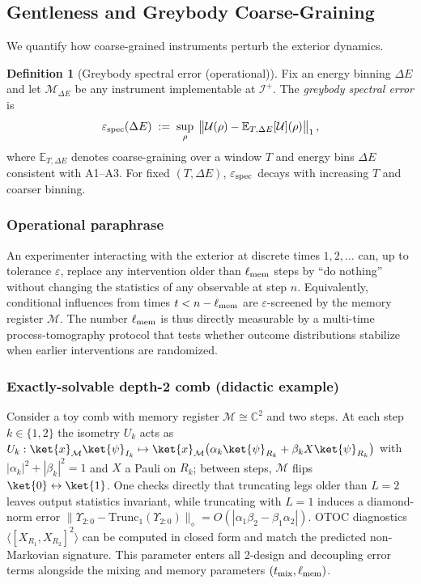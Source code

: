\documentclass[11pt,a4paper]{article}
\theoremstyle{plain}
\theoremstyle{definition}
\newtheorem{definition}[theorem]{Definition}
\theoremstyle{remark}
\begin{document}
\subsection{Gentleness and Greybody Coarse-Graining}

\label{sec:gentleness}
We quantify how coarse-grained instruments perturb the exterior dynamics.
\begin{definition}[Greybody spectral error (operational)]
Fix an energy binning $\Delta E$ and let $\mathcal{M}_{\Delta E}$ be any instrument implementable at $\mathscr{I}^+$. The \emph{greybody spectral error} is
\begin{equation*}
\varepsilon_{\rm spec}(\Delta E) \;:=\; \sup_{\rho}\; \big\| \mathcal{U}(\rho) - \mathbb{E}_{T,\Delta E}[\mathcal{U}](\rho) \big\|_1\,,
\end{equation*}
where $\mathbb{E}_{T,\Delta E}$ denotes coarse-graining over a window $T$ and energy bins $\Delta E$ consistent with A1--A3. For fixed $(T,\Delta E)$, $\varepsilon_{\rm spec}$ decays with increasing $T$ and coarser binning.
\end{definition}

\subsubsection{Operational paraphrase}
An experimenter interacting with the exterior at discrete times $1,2,\dots$ can, up to tolerance $\varepsilon$,
replace any intervention older than $\ell_{\rm mem}$ steps by ``do nothing'' without changing the statistics
of any observable at step $n$. Equivalently, conditional influences from times $t<n-\ell_{\rm mem}$ are
$\varepsilon$-screened by the memory register $\mathcal{M}$. The number $\ell_{\rm mem}$ is thus directly
measurable by a multi-time process-tomography protocol that tests whether outcome distributions stabilize
when earlier interventions are randomized.

\subsubsection*{Exactly-solvable depth-2 comb (didactic example)}
\label{sssec:depth2-didactic}
Consider a toy comb with memory register $\mathcal{M}\cong\mathbb{C}^2$ and two steps.
At each step $k\in\{1,2\}$ the isometry $U_k$ acts as
$U_k:\ket{x}_{\mathcal{M}}\ket{\psi}_{I_k}\mapsto \ket{x}_{\mathcal{M}}\big(\alpha_k \ket{\psi}_{R_k}+\beta_k X\ket{\psi}_{R_k}\big)$
with $|\alpha_k|^2+|\beta_k|^2=1$ and $X$ a Pauli on $R_k$; between steps, $\mathcal{M}$ flips $\ket{0}\leftrightarrow\ket{1}$.
One checks directly that truncating legs older than $L{=}2$ leaves output statistics invariant, while truncating with $L{=}1$
induces a diamond-norm error $\|\Upsilon_{2{:}0}-\mathrm{Trunc}_1(\Upsilon_{2{:}0})\|_\diamond = O(|\alpha_1\beta_2-\beta_1\alpha_2|)$.
OTOC diagnostics $\langle [X_{R_1},X_{R_2}]^2\rangle$ can be computed in closed form and match the predicted non-Markovian signature.
This parameter enters all 2-design and decoupling error terms alongside the mixing and memory parameters $(t_{\rm mix},\ell_{\rm mem})$.
\end{document}
